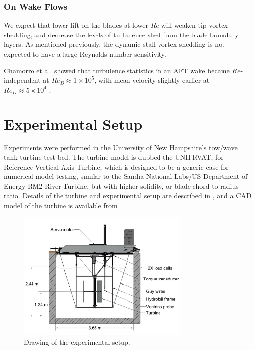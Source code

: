 \documentclass[energies,article,accept,moreauthors,pdftex,12pt,a4paper]{mdpi}
\begin{document}
\subsubsection{On Wake Flows}

We expect that lower lift on the blades at lower $Re$ will weaken tip vortex
shedding, and decrease the levels of turbulence shed from the blade boundary
layers. As mentioned previously, the dynamic stall vortex shedding is not
expected to have a large Reynolds number sensitivity.


Chamorro et al. showed that turbulence statistics in an AFT wake became
$Re$-independent at $Re_D \approx 1 \times 10^5$, with mean velocity slightly
earlier at $Re_D \approx 5 \times 10^4$ \cite{Chamorro2012}.

\section{Experimental Setup}

Experiments were performed in the University of New Hampshire's tow/wave tank
turbine test bed. The turbine model is dubbed the UNH-RVAT, for Reference
Vertical Axis Turbine, which is designed to be a generic case for numerical
model testing, similar to the Sandia National Labs/US Department of Energy RM2
River Turbine, but with higher solidity, or blade chord to radius ratio. Details
of the turbine and experimental setup are described in \cite{Bachant2015-JoT},
and a CAD model of the turbine is available from \cite{Bachant2014-RVAT-CAD}.

\begin{figure}[ht!]
\centering
\includegraphics[width=0.75\textwidth]{figures/exp_setup_drawing}
\caption{Drawing of the experimental setup.}
\label{fig:exp-setup}
\end{figure}
\end{document}
